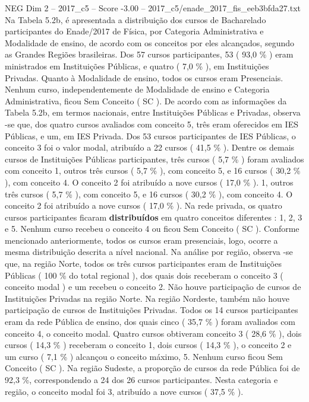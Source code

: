\begin{textsample}{NEG Dim 2 – 2017\_c5 – Score -3.00 – 2017\_c5/enade\_2017\_fis\_eeb3bfda27.txt}
Na Tabela 5.2b, é apresentada a distribuição dos cursos de Bacharelado participantes do Enade/2017 de Física, por Categoria Administrativa e Modalidade de ensino, de acordo com os conceitos por eles alcançados, segundo as Grandes Regiões brasileiras.
Dos 57 cursos participantes, 53 ( 93,0 \% ) eram ministrados em Instituições Públicas, e quatro ( 7,0 \% ), em Instituições Privadas.
Quanto à Modalidade de ensino, todos os cursos eram Presenciais.
Nenhum curso, independentemente de Modalidade de ensino e Categoria Administrativa, ficou Sem Conceito ( SC ).
De acordo com as informações da Tabela 5.2b, em termos nacionais, entre Instituições Públicas e Privadas, observa -se que, dos quatro cursos avaliados com conceito 5, três eram oferecidos em IES Públicas, e um, em IES Privada.
Dos 53 cursos participantes de IES Públicas, o conceito 3 foi o valor modal, atribuído a 22 cursos ( 41,5 \% ).
Dentre os demais cursos de Instituições Públicas participantes, três cursos ( 5,7 \% ) foram avaliados com conceito 1, outros três cursos ( 5,7 \% ), com conceito 5, e 16 cursos ( 30,2 \% ), com conceito 4.
O conceito 2 foi atribuído a nove cursos ( 17,0 \% ). 1, outros três cursos ( 5,7 \% ), com conceito 5, e 16 cursos ( 30,2 \% ), com conceito 4.
O conceito 2 foi atribuído a nove cursos ( 17,0 \% ).
Na rede privada, os quatro cursos participantes ficaram \textbf{distribuídos} em quatro conceitos diferentes : 1, 2, 3 e 5.
Nenhum curso recebeu o conceito 4 ou ficou Sem Conceito ( SC ).
Conforme mencionado anteriormente, todos os cursos eram presenciais, logo, ocorre a mesma distribuição descrita a nível nacional.
Na análise por região, observa -se que, na região Norte, todos os três cursos participantes eram de Instituições Públicas ( 100 \% do total regional ), dos quais dois receberam o conceito 3 ( conceito modal ) e um recebeu o conceito 2.
Não houve participação de cursos de Instituições Privadas na região Norte.
Na região Nordeste, também não houve participação de cursos de Instituições Privadas.
Todos os 14 cursos participantes eram da rede Pública de ensino, dos quais cinco ( 35,7 \% ) foram avaliados com conceito 4, o conceito modal.
Quatro cursos obtiveram conceito 3 ( 28,6 \% ), dois cursos ( 14,3 \% ) receberam o conceito 1, dois cursos ( 14,3 \% ), o conceito 2 e um curso ( 7,1 \% ) alcançou o conceito máximo, 5.
Nenhum curso ficou Sem Conceito ( SC ).
Na região Sudeste, a proporção de cursos da rede Pública foi de 92,3 \%, correspondendo a 24 dos 26 cursos participantes.
Nesta categoria e região, o conceito modal foi 3, atribuído a nove cursos ( 37,5 \% ).

\end{textsample}
